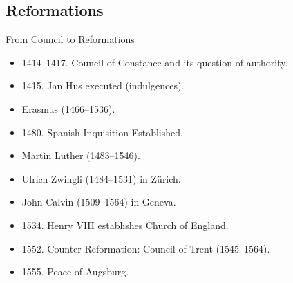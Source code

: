 \subsection{Reformations}
\begin{frame}{From Council to Reformations}
	\begin{itemize}
		\item<1->1414--1417. Council of Constance and its question of authority.
		\item<2->1415. Jan Hus executed (indulgences).
		\item<3->Erasmus (1466--1536).
		\item<4->1480. Spanish Inquisition Established.
		\item<5->Martin Luther (1483--1546).
		\item<6->Ulrich Zwingli (1484--1531) in Z{\"u}rich.
		\item<7->John Calvin (1509--1564) in Geneva.
		\item<8->1534. Henry VIII establishes Church of England.
		\item<9->1552. Counter-Reformation: Council of Trent (1545--1564).
		\item<10->1555. Peace of Augsburg.
	\end{itemize}
\end{frame}

